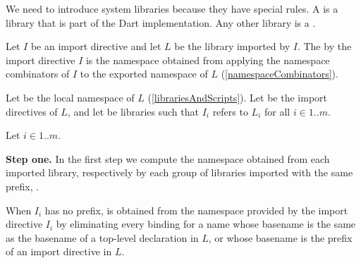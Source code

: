 \documentclass[makeidx]{article}
\begin{document}
{\LMHash{}%
We need to introduce system libraries because they have special rules.
A  is a library that is part of the Dart implementation.
Any other library is a .



\LMHash{}%
Let $I$ be an import directive and let $L$ be the library imported by $I$.
The
by the import directive $I$ is the namespace obtained from applying
the namespace combinators of $I$
to the exported namespace of $L$
(\ref{namespaceCombinators}).


\LMHash{}%
Let  be the local namespace of $L$
(\ref{librariesAndScripts}).
Let  be the import directives of $L$,
and let  be libraries
such that $I_i$ refers to $L_i$ for all $i \in 1 .. m$.

\LMHash{}%
Let $i \in 1 .. m$.

\LMHash{}%
{\bf Step one.}
In the first step we compute the namespace obtained from each imported library,
respectively by each group of libraries imported with the same prefix,
.

\LMHash{}%
When $I_i$ has no prefix,  is obtained
from the namespace provided by the import directive $I_i$
by eliminating every binding for a name whose basename is
the same as the basename of a top-level declaration in $L$,
or whose basename is the prefix of an import directive in $L$.

}
\end{document}
